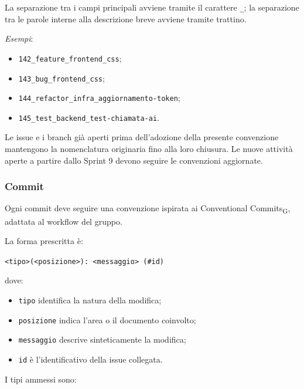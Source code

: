 La separazione tra i campi principali avviene tramite il carattere
\texttt{\_}; la separazione tra le parole interne alla descrizione breve avviene
tramite trattino.

\textit{Esempi}:

\begin{itemize}
    \item \texttt{142\_feature\_frontend\_css};
    \item \texttt{143\_bug\_frontend\_css};
    \item \texttt{144\_refactor\_infra\_aggiornamento-token};
    \item \texttt{145\_test\_backend\_test-chiamata-ai}.
\end{itemize}

Le issue e i branch già aperti prima dell'adozione della presente convenzione
mantengono la nomenclatura originaria fino alla loro chiusura. Le nuove attività
aperte a partire dallo Sprint 9 devono seguire le convenzioni aggiornate.


\subsubsection{Commit}

Ogni commit deve seguire una convenzione ispirata ai Conventional Commits\textsubscript{G},
adattata al workflow del gruppo.

La forma prescritta è:

\begin{center}
    \texttt{<tipo>(<posizione>): <messaggio> (\#id)}
\end{center}

dove:

\begin{itemize}
    \item \texttt{tipo} identifica la natura della modifica;
    \item \texttt{posizione} indica l'area o il documento coinvolto;
    \item \texttt{messaggio} descrive sinteticamente la modifica;
    \item \texttt{id} è l'identificativo della issue collegata.
\end{itemize}

I tipi ammessi sono:

